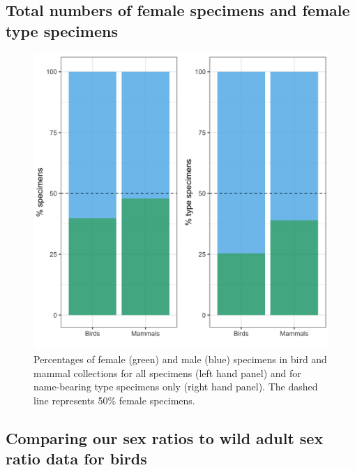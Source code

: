 \documentclass[a4paper, 12pt]{article}
\begin{document}


\subsection*{Total numbers of female specimens and female type specimens}


\begin{figure}[H]
 \centering
  \includegraphics[width = \linewidth]{figures/types-all.png}
  \caption{Percentages of female (green) and male (blue) specimens in bird and mammal collections for all specimens (left hand panel) and for name-bearing type specimens only (right hand panel). 
  The dashed line represents 50\% female specimens.}
  \label{fig-types}
\end{figure}





\subsection*{Comparing our sex ratios to wild adult sex ratio data for birds}
\end{document}
